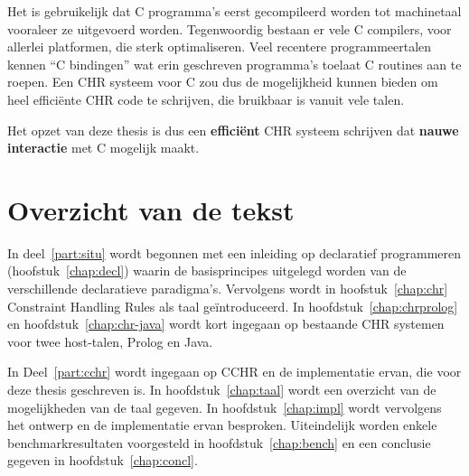 Het is gebruikelijk dat C programma's eerst gecompileerd worden tot machinetaal vooraleer ze uitgevoerd worden. Tegenwoordig bestaan er vele C compilers, voor allerlei platformen, die sterk optimaliseren. Veel recentere programmeertalen kennen ``C bindingen'' wat erin geschreven programma's toelaat C routines aan te roepen. Een CHR systeem voor C zou dus de mogelijkheid kunnen bieden om heel effici\"ente CHR code te schrijven, die bruikbaar is vanuit vele talen.

Het opzet van deze thesis is dus een {\bf effici\"ent} CHR systeem schrijven dat {\bf nauwe interactie} met C mogelijk maakt.

\section{Overzicht van de tekst}

In deel~\ref{part:situ} wordt begonnen met een inleiding op declaratief programmeren (hoofstuk~\ref{chap:decl}) waarin de basisprincipes uitgelegd worden van de verschillende declaratieve paradigma's. Vervolgens wordt in hoofstuk~\ref{chap:chr} Constraint Handling Rules als taal ge\"introduceerd. In hoofdstuk~\ref{chap:chrprolog} en hoofdstuk~\ref{chap:chr-java} wordt kort ingegaan op bestaande CHR systemen voor twee host-talen, Prolog en Java.

In Deel~\ref{part:cchr} wordt ingegaan op CCHR en de implementatie ervan, die voor deze thesis geschreven is. In hoofdstuk~\ref{chap:taal} wordt een overzicht van de mogelijkheden van de taal gegeven. In hoofdstuk~\ref{chap:impl} wordt vervolgens het ontwerp en de implementatie ervan besproken. Uiteindelijk worden enkele benchmarkresultaten voorgesteld in hoofdstuk~\ref{chap:bench} en een conclusie gegeven in hoofdstuk~\ref{chap:concl}.
